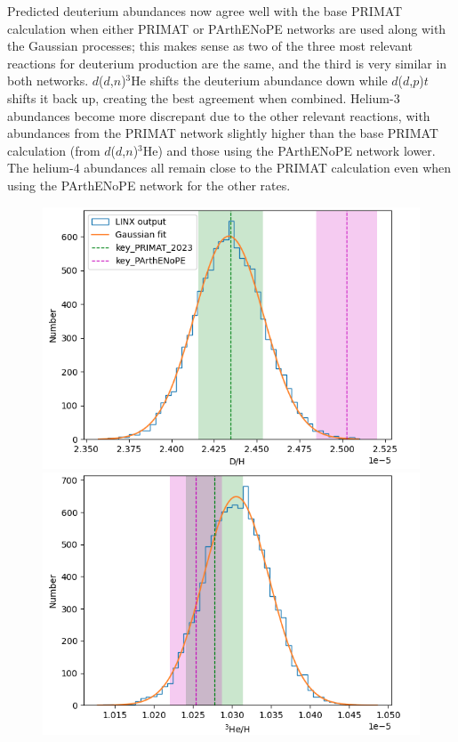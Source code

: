\documentclass[%
 reprint,
superscriptaddress,
nofootinbib,
 amsmath,amssymb,
 aps,
 pra,
]{revtex4-2}
\begin{document}
Predicted deuterium abundances now agree well with the base PRIMAT calculation when either PRIMAT or PArthENoPE networks are used along with the Gaussian processes; this makes sense as two of the three most relevant reactions for deuterium production are the same, and the third is very similar in both networks. $d$($d$,$n$)$^3$He shifts the deuterium abundance down while $d$($d$,$p$)$t$ shifts it back up, creating the best agreement when combined. Helium-3 abundances become more discrepant due to the other relevant reactions, with abundances from the PRIMAT network slightly higher than the base PRIMAT calculation (from $d$($d$,$n$)$^3$He) and those using the PArthENoPE network lower. The helium-4 abundances all remain close to the PRIMAT calculation even when using the PArthENoPE network for the other rates. 

\begin{figure}
	\centering
	\begin{minipage}{0.32\textwidth}
		\centering
		\includegraphics[width=\linewidth]{Figures/dd_theory_dh.png}
	\end{minipage}
	\hspace{0mm}
	\begin{minipage}{0.32\textwidth}
		\centering
		\includegraphics[width=\linewidth]{Figures/dd_theory_he3h.png}

\end{minipage}
\end{figure}
\end{document}

